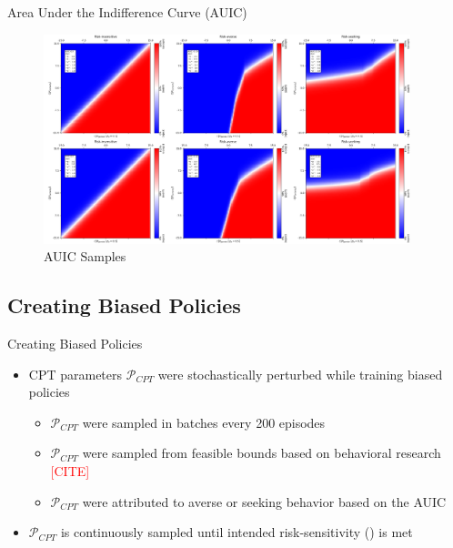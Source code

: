 \documentclass[aspectratio=1610, xcolor=dvipsnames]{packages/beamer}
\newcommand{\add}{\textcolor{red}}
\begin{document}
\begin{frame}{Area Under the Indifference Curve (AUIC)}
     \begin{figure}
        \centering
        \includegraphics[width=0.95\textwidth]{../results/Fig_AUIC}
        \caption{AUIC Samples}
        \label{fig:AUIC}
    \end{figure}

\end{frame}


\subsection{Creating Biased Policies}\begin{frame}{Creating Biased Policies}
    \begin{itemize}
        \item \Ac{CPT} parameters $\mathcal{P}_{CPT}$ were stochastically perturbed while training biased policies
        \begin{itemize}
            \item $\mathcal{P}_{CPT}$ were sampled in batches every 200 episodes
            \item $\mathcal{P}_{CPT}$ were sampled from feasible bounds based on behavioral research \add{[CITE]}
            \item $\mathcal{P}_{CPT}$ were attributed to averse or seeking behavior based on the \ac{AUIC}
        \end{itemize}
        \item $\mathcal{P}_{CPT}$ is continuously sampled until intended risk-sensitivity () is met
    \end{itemize}
\end{frame}
\end{document}
